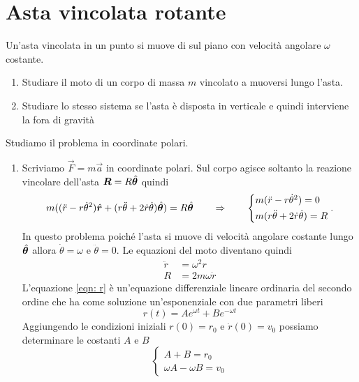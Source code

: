 \section{Asta vincolata rotante}
\begin{testo}
	Un'asta vincolata in un punto si muove di sul piano con velocità angolare $ \omega $ costante.
	\begin{enumerate}
		\item Studiare il moto di un corpo di massa $ m $ vincolato a muoversi lungo l'asta.
		\item Studiare lo stesso sistema se l'asta è disposta in verticale e quindi interviene la fora di gravità
	\end{enumerate}
\end{testo}
\smallskip
\begin{sol}
	Studiamo il problema in coordinate polari. 
	\begin{enumerate}
		\item Scriviamo $ \vec F = m \vec a $ in coordinate polari. Sul corpo agisce soltanto la reazione vincolare dell'asta $ \boldsymbol{R} = R \hat{\boldsymbol{\theta}} $ quindi
		\[ m ((\ddot r - r \dot \theta^2)\vers{r} + (r \ddot{\theta} + 2 \dot{r} \dot{\theta}) \vers{\theta}) = R \vers{\theta}
		\qquad \Rightarrow \qquad 
		\begin{cases*}
		m(\ddot r - r \dot \theta^2) = 0 \\
		m(r \ddot{\theta} + 2 \dot{r} \dot{\theta}) = R 
		\end{cases*}.\]
		In questo problema poiché l'asta si muove di velocità angolare costante lungo $ \hat{\boldsymbol{\theta}} $ allora $ \dot{\theta} = \omega $ e $ \ddot{\theta} = 0 $. Le equazioni del moto diventano quindi
		\begin{align}
		\ddot{r} & = \omega^2 r \label{eqn: r}\\
		R & = 2 m \omega \dot{r} \label{eqn: theta} 
		\end{align}
		L'equazione \eqref{eqn: r} è un'equazione differenziale lineare ordinaria del secondo ordine che ha come soluzione un'esponenziale con due parametri liberi
		\begin{equation} \label{eqn: sol generale r}
			r(t) = A e^{\omega t} + B e^{- \omega t}
		\end{equation}
		Aggiungendo le condizioni iniziali $ r(0) = r_0 $ e $ \dot{r}(0) = v_0 $ possiamo determinare le costanti $ A $ e $ B $
		\[\begin{cases*}
		A + B = r_0 \\
		\omega A - \omega B = v_0
		\end{cases*}
\]
\end{enumerate}
\end{sol}
